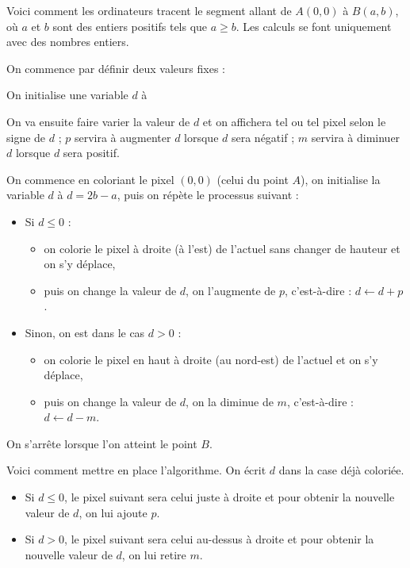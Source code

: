 \documentclass[class=report,crop=false, 12pt]{standalone}
\begin{document}
\begin{activite}

Voici comment les ordinateurs tracent le segment allant de $A(0,0)$ à $B(a,b)$, où $a$ et $b$ sont des entiers positifs tels que $a \ge b$. Les calculs se font uniquement avec des nombres entiers.



On commence par définir deux valeurs fixes :


On initialise une variable $d$ à 


On va ensuite faire varier la valeur de $d$ et on affichera tel ou tel pixel selon le signe de $d$ ;
$p$ servira à augmenter $d$ lorsque $d$ sera négatif ;
$m$ servira à diminuer $d$ lorsque $d$ sera positif.

\bigskip

On commence en coloriant le pixel $(0,0)$ (celui du point $A$), on initialise la variable $d$ à $d=2b-a$, puis on répète le processus suivant :
\begin{itemize}
  \item Si $d \le 0$ :
  \begin{itemize}
    \item on colorie le pixel à droite (à l'est) de l'actuel sans changer de hauteur et on s'y déplace, 
    \item puis on change la valeur de $d$, on l'augmente de $p$, c'est-à-dire : $d \leftarrow d + p$.
  \end{itemize}
  \item Sinon, on est dans le cas $d > 0$ :
  \begin{itemize}
    \item on colorie le pixel en haut à droite (au nord-est) de l'actuel et on s'y déplace, 
    \item puis on change la valeur de $d$, on la diminue de $m$, c'est-à-dire : $d \leftarrow d - m$.
  \end{itemize}  
\end{itemize} 



On s'arrête lorsque l'on atteint le point $B$.

Voici comment mettre en place l'algorithme. On écrit $d$ dans la case déjà coloriée.
\begin{itemize}
  \item Si $d \le 0$, le pixel suivant sera celui juste à droite et pour obtenir la nouvelle valeur de $d$, on lui ajoute $p$.
  \item Si $d > 0$, le pixel suivant sera celui au-dessus à droite et pour obtenir la nouvelle valeur de $d$, on lui retire $m$.
\end{itemize}


\end{activite}
\end{document}
